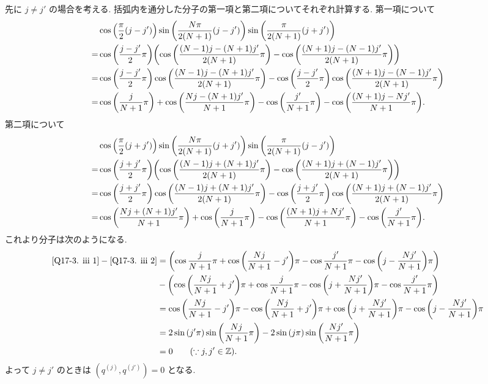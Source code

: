 \documentclass[uplatex,dvipdfmx,a4paper,11pt]{jlreq}
\theoremstyle{definition}
\newcommand{\ZZ}{\mathbb{Z}}
\begin{document}
先に $j \neq j'$ の場合を考える. 括弧内を通分した分子の第一項と第二項についてそれぞれ計算する. 第一項について
\begin{align}
    & \cos\qty(\frac{\pi}{2}(j - j'))\sin\qty(\frac{N\pi}{2(N+1)}(j - j'))\sin\qty(\frac{\pi}{2(N+1)}(j + j'))                                                       \\
  = & \cos\qty(\frac{j - j'}{2}\pi)\qty(\cos\qty(\frac{(N-1)j - (N+1)j'}{2(N+1)}\pi) - \cos\qty(\frac{(N+1)j - (N-1)j'}{2(N+1)}\pi))                                 \\
  = & \cos\qty(\frac{j - j'}{2}\pi)\cos\qty(\frac{(N-1)j - (N+1)j'}{2(N+1)}\pi) - \cos\qty(\frac{j - j'}{2}\pi)\cos\qty(\frac{(N+1)j - (N-1)j'}{2(N+1)}\pi)          \\
  = & \cos\qty(\frac{j}{N+1}\pi) + \cos\qty(\frac{Nj - (N+1)j'}{N+1}\pi) - \cos\qty(\frac{j'}{N+1}\pi) - \cos\qty(\frac{(N+1)j - Nj'}{N+1}\pi). \label{Q17-3. iii 1}
\end{align}
第二項について
\begin{align}
    & \cos\qty(\frac{\pi}{2}(j + j'))\sin\qty(\frac{N\pi}{2(N+1)}(j + j'))\sin\qty(\frac{\pi}{2(N+1)}(j - j'))                                                       \\
  = & \cos\qty(\frac{j + j'}{2}\pi)\qty(\cos\qty(\frac{(N-1)j + (N+1)j'}{2(N+1)}\pi) - \cos\qty(\frac{(N+1)j + (N-1)j'}{2(N+1)}\pi))                                 \\
  = & \cos\qty(\frac{j + j'}{2}\pi)\cos\qty(\frac{(N-1)j + (N+1)j'}{2(N+1)}\pi) - \cos\qty(\frac{j + j'}{2}\pi)\cos\qty(\frac{(N+1)j + (N-1)j'}{2(N+1)}\pi)          \\
  = & \cos\qty(\frac{Nj + (N+1)j'}{N+1}\pi) + \cos\qty(\frac{j}{N+1}\pi) - \cos\qty(\frac{(N+1)j + Nj'}{N+1}\pi) - \cos\qty(\frac{j'}{N+1}\pi). \label{Q17-3. iii 2}
\end{align}
これより分子は次のようになる.
\begin{align}
  \eqref{Q17-3. iii 1} - \eqref{Q17-3. iii 2} & = \qty(\cos\frac{j}{N+1}\pi + \cos\qty(\frac{Nj}{N+1} - j')\pi - \cos\frac{j'}{N+1}\pi - \cos\qty(j - \frac{Nj'}{N+1})\pi)                  \\
                                              & - \qty(\cos\qty(\frac{Nj}{N+1} + j')\pi + \cos\frac{j}{N+1}\pi - \cos\qty(j + \frac{Nj'}{N+1})\pi - \cos\frac{j'}{N+1}\pi)                  \\
                                              & = \cos\qty(\frac{Nj}{N+1} - j')\pi - \cos\qty(\frac{Nj}{N+1} + j')\pi + \cos\qty(j + \frac{Nj'}{N+1})\pi - \cos\qty(j - \frac{Nj'}{N+1})\pi \\
                                              & = 2\sin\qty(j'\pi)\sin\qty(\frac{Nj}{N+1}\pi) - 2\sin\qty(j\pi)\sin\qty(\frac{Nj'}{N+1}\pi)                                                 \\
                                              & = 0 \qquad (\because j, j'\in\ZZ).
\end{align}
よって $j \neq j'$ のときは $(q^{(j)}, q^{(j')}) = 0$ となる.
\end{document}
